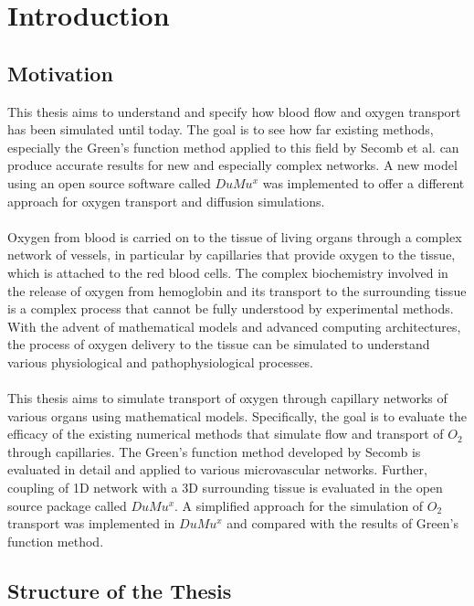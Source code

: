 
\section{Introduction}
\label{s:Introduction}

\subsection{Motivation}

This thesis aims to understand and specify how blood flow and oxygen transport has been simulated until today. The goal is to see how far existing methods, especially the Green's function method applied to this field by Secomb et al. \cite{Secomb2004} can produce accurate results for new and especially complex networks. A new model using an open source software called $DuMu^x$ \cite{flemischdumux} was implemented to offer a different approach for oxygen transport and diffusion simulations.\\
\\Oxygen from blood is carried on to the tissue of living organs through a complex network of vessels, in particular by capillaries that provide oxygen to the tissue, which is attached to the red blood cells. The complex biochemistry involved in the release of oxygen from hemoglobin and its transport to the surrounding tissue is a complex process that cannot be fully understood by experimental methods. With the advent of mathematical models and advanced computing architectures, the process of oxygen delivery to the tissue can be simulated to understand various physiological and pathophysiological processes.\\
\\This thesis aims to simulate transport of oxygen through capillary networks of various organs using mathematical models. Specifically, the goal is to evaluate the efficacy of the existing numerical methods that simulate flow and transport of $O_2$ through capillaries. The Green's function method developed by Secomb is evaluated in detail and applied to various microvascular networks. Further, coupling of 1D network with a 3D surrounding tissue is evaluated in the open source package called $DuMu^x$. A simplified approach for the simulation of $O_2$ transport was implemented in $DuMu^x$ and compared with the results of Green's function method.

\subsection{Structure of the Thesis}

